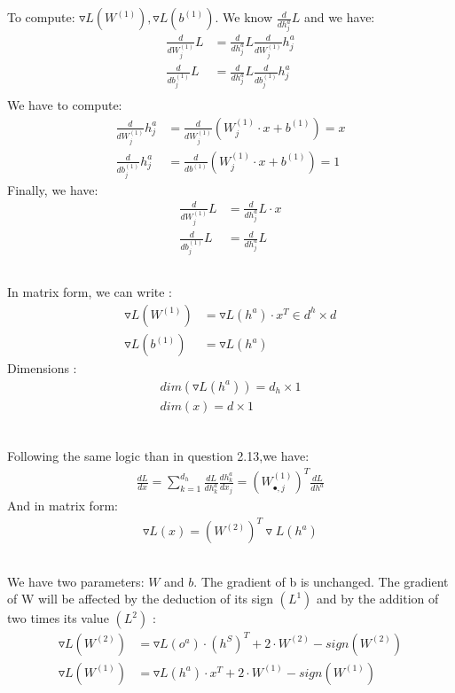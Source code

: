 \documentclass[12pt]{article}
\begin{document}
\subsection{}
To compute: $\triangledown L(W^{(1)}), \triangledown L(b^{(1)})$.
We know $\frac{d}{dh^a_j} L$ and we have:
\begin{align*}
\frac{d}{dW^{(1)}_j} L &= \frac{d}{dh^a_j} L \frac{d}{dW^{(1)}_j} h^a_j \\
\frac{d}{db^{(1)}_j} L &= \frac{d}{dh^a_j} L \frac{d}{db^{(1)}_j} h^a_j \\
\end{align*}
We have to compute:
\begin{align*}
\frac{d}{dW^{(1)}_j} h^a_j & = \frac{d}{dW^{(1)}_j} (W^{(1)}_j \cdot x + b^{(1)}) = x \\
\frac{d}{db^{(1)}_{j}} h^a_j &= \frac{d}{db^{(1)}} (W^{(1)}_{j} \cdot x + b^{(1)}) = 1
\end{align*}
Finally, we have:
\begin{align*}
\frac{d}{dW^{(1)}_j} L &= \frac{d}{dh^a_j} L \cdot x\\
\frac{d}{db^{(1)}_j} L &= \frac{d}{dh^a_j} L
\end{align*}
\subsection{}
In matrix form, we can write :
\begin{align*}
\triangledown L(W^{(1)})  & =  \triangledown L(h^a) \cdot x^T \in d^h \times d\\
\triangledown L(b^{(1)})  & = \triangledown L(h^a) 
\end{align*}
Dimensions :
\begin{align*}
dim(\triangledown L(h^a)) = d_h \times 1 \\
dim(x) = d \times 1 \\
\end{align*}
\subsection{}
Following the same logic than in question 2.13,we have:
\begin{align*}
\frac{dL}{dx} = \sum\limits_{k=1}^{d_h} \frac{dL}{dh^a_k} \frac{dh^a_k}{dx_j} = (W^{(1)}_{\bullet,j})^T \frac{dL}{dh^a}
\end{align*}
And in matrix form:
\begin{align*}
\triangledown L(x) = (W^{(2)})^T \triangledown L (h^a)
\end{align*}
\subsection{}
We have two parameters: $W$ and $b$. The gradient of b is unchanged. The gradient of W will be affected by the deduction of its sign $(L^1)$ and by the addition of two times its value $(L^2)$ :
\begin{align*} 
\triangledown L(W^{(2)}) & = \triangledown L(o^a) \cdot (h^S)^T + 2 \cdot W^{(2)} - sign(W^{(2)}) \\
\triangledown L(W^{(1)}) & = \triangledown L(h^a) \cdot x^T + 2 \cdot W^{(1)} - sign(W^{(1)}) \\
\end{align*}
\end{document}
